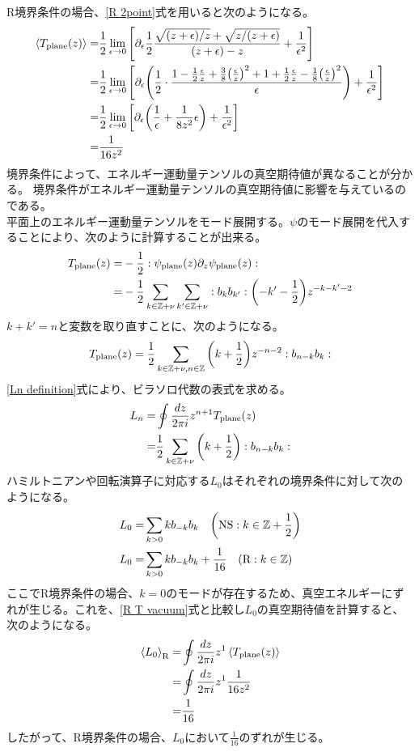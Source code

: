 \documentclass[11pt, dvipdfmx]{article}
\numberwithin{equation}{section}
\begin{document}
R境界条件の場合、\eqref{R 2point}式を用いると次のようになる。
\begin{align}
    \ev{T_{\text{plane}}(z)}=& \frac{1}{2}\lim_{\epsilon \to 0}\qty[\partial_\epsilon \frac{1}{2}\frac{\sqrt{(z+\epsilon)/z}+\sqrt{z/(z+\epsilon)}}{(z+\epsilon)-z} +\frac{1}{\epsilon^2}]\\
    =& \frac{1}{2}\lim_{\epsilon \to 0}\qty[\partial_\epsilon\qty(\frac{1}{2}\cdot\frac{1-\frac{1}{2}\frac{\epsilon}{z}+\frac{3}{8}\qty(\frac{\epsilon}{z})^2+1+\frac{1}{2}\frac{\epsilon}{z}-\frac{1}{8}\qty(\frac{\epsilon}{z})^2 }{\epsilon} )+\frac{1}{\epsilon^2}]  \\
    =& \frac{1}{2}\lim_{\epsilon \to 0}\qty[\partial_\epsilon\qty(\frac{1}{\epsilon}+  \frac{1}{8 z^2}\epsilon) +\frac{1}{\epsilon^2}]\\
    =& \frac{1}{16 z^2}\label{R T vacuum}
\end{align}
境界条件によって、エネルギー運動量テンソルの真空期待値が異なることが分かる。
境界条件がエネルギー運動量テンソルの真空期待値に影響を与えているのである。\\

平面上のエネルギー運動量テンソルをモード展開する。$\psi$のモード展開を代入することにより、次のように計算することが出来る。
\begin{align}
    T_{\text{plane}}(z)=& -\frac{1}{2}:\psi_{\text{plane}}(z)\partial_z \psi_{\text{plane}}(z):\\
    =& -\frac{1}{2}\sum_{k\in \mathbb{Z}+\nu}\sum_{k'\in \mathbb{Z}+\nu} :b_k b_{k'}: \qty(-k'-\frac{1}{2}) z^{-k-k'-2}
\end{align}
$k+k'=n$と変数を取り直すことに、次のようになる。
\begin{align}
   T_{\text{plane}}(z)=\frac{1}{2}\sum_{k\in \mathbb{Z}+\nu, n\in\mathbb{Z}}\qty(k+\frac{1}{2})z^{-n-2}:b_{n-k}b_k:
\end{align}
\eqref{Ln definition}式により、ビラソロ代数の表式を求める。
\begin{align}
    L_n=& \oint \frac{dz}{2\pi i} z^{n+1} T_{\text{plane}}(z)\\
    =& \frac{1}{2}\sum_{k\in \mathbb{Z}+\nu}\qty(k+\frac{1}{2}):b_{n-k}b_k:
\end{align}
ハミルトニアンや回転演算子に対応する$L_0$はそれぞれの境界条件に対して次のようになる。
\begin{align}
    L_0=& \sum_{k>0} k b_{-k}b_k \ \ \ \qty(\text{NS}:k\in \mathbb{Z}+\frac{1}{2})\\
    L_0=& \sum_{k>0} k b_{-k}b_k +\frac{1}{16} \ \ \ \qty(\text{R}:k\in \mathbb{Z})
\end{align}
ここでR境界条件の場合、$k=0$のモードが存在するため、真空エネルギーにずれが生じる。これを、\eqref{R T vacuum}式と比較し$L_0$の真空期待値を計算すると、次のようになる。
\begin{align}
    \ev{L_0}_{\text{R}}=& \oint \frac{dz}{2\pi i} z^{1}\ev{T_{\text{plane}}(z)}\\
    =& \oint \frac{dz}{2\pi i} z^{1}\frac{1}{16 z^2}\\
    =& \frac{1}{16}
\end{align}
したがって、R境界条件の場合、$L_0$において$\frac{1}{16}$のずれが生じる。
\end{document}

